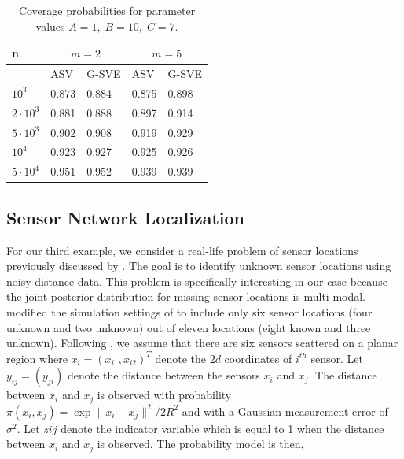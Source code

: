 \documentclass[11pt]{article}
\theoremstyle{remark}
\begin{document}
\begin{table}[h]
\centering
    \begin{tabular}{p{1cm}|p{2cm}|p{2cm}|p{2cm}|p{2cm}}
        n & \multicolumn{2}{|c|}{$m = 2$} & \multicolumn{2}{|c|}{$m=5$}\\
        \hline
        & ASV & G-SVE & ASV & G-SVE\\
        \hline
        $10^3$ & 0.873 & 0.884 & 0.875 & 0.898   \\
        $2\cdot10^3$ & 0.881 &  0.888 & 0.897    & 0.914     \\
        $5 \cdot 10^3$  & 0.902 & 0.908 &  0.919 & 0.929\\
        $10^4$  & 0.923 & 0.927 & 0.925 & 0.926 \\
        $5 \cdot 10^4$ & 0.951& 0.952 & 0.939 & 0.939  \\
    \end{tabular}
    \caption{Coverage probabilities for parameter values $A = 1,\; B = 10,\; C = 7$. }
    \label{table:boom-coverage_1_10_7}
\end{table}

\subsection{Sensor Network Localization}

For our third example, we consider a real-life problem of sensor locations previously discussed by \cite{ihler2005nonparametric}. The goal is to identify unknown sensor locations using noisy distance data. This problem is specifically interesting in our case because the joint posterior distribution for missing sensor locations is multi-modal. \\

\cite{tak2018repelling} modified the simulation settings of \cite{lan2014wormhole} to include only six sensor locations (four unknown and two unknown) out of eleven locations (eight known and three unknown). Following \cite{tak2018repelling}, we assume that there are six sensors scattered on a planar region where $x_i = (x_{i1}, x_{i2})^T$ denote the $2d$ coordinates of $i^{th}$ sensor. Let $y_{ij} = (y_{ji})$ denote the distance between the sensors $x_i$ and $x_j$. The distance between $x_i$ and $x_j$ is observed with probability $\pi (x_i, x_j) = \exp{\|x_i - x_j\|^2 / 2R^2}$ and with a Gaussian measurement error of $\sigma^2$. Let $z{ij}$ denote the indicator variable which is equal to 1 when the distance between $x_i$ and $x_j$ is observed. The probability model is then,
\end{document}
